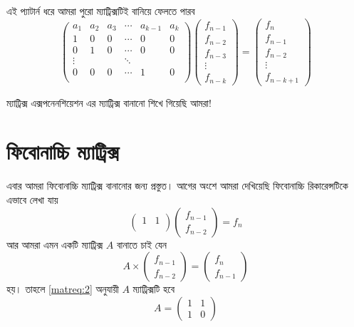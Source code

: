 \noindent এই প্যাটার্ন ধরে আমরা পুরো ম্যাট্রিক্সটিই বানিয়ে ফেলতে পারব
\begin{equation}
  \label{matreq:2}
  \begin{pmatrix}
  a_1 & a_2 & a_3 & \cdots & a_{k - 1} & a_k \\
  1 & 0 & 0 & \cdots & 0 & 0 \\
  0 & 1 & 0 & \cdots & 0 & 0 \\
  \vdots & & & \ddots \\
  0 & 0 & 0 & \cdots & 1 & 0 \\
  \end{pmatrix}
  \begin{pmatrix}
  f_{n - 1} \\
  f_{n - 2} \\
  f_{n - 3} \\
  \vdots \\
  f_{n - k}
  \end{pmatrix}
  =
  \begin{pmatrix}
  f_{n} \\
  f_{n - 1} \\
  f_{n - 2} \\
  \vdots \\
  f_{n - k + 1}
  \end{pmatrix}
\end{equation}

\noindent ম্যাট্রিক্স এক্সপনেনশিয়েশন এর ম্যাট্রিক্স বানানো শিখে গিয়েছি আমরা!

\section{ফিবোনাচ্চি ম্যাট্রিক্স}

\noindent এবার আমরা ফিবোনাচ্চি ম্যাট্রিক্স বানানোর জন্য প্রস্তুত। আগের অংশে আমরা দেখিয়েছি ফিবোনাচ্চি রিকারেন্সটিকে এভাবে লেখা যায়
$$
\begin{pmatrix}
1 & 1 \\
\end{pmatrix}
\begin{pmatrix}
f_{n - 1} \\
f_{n - 2}
\end{pmatrix}
=
f_n
$$
\noindent আর আমরা এমন একটি ম্যাট্রিক্স $A$ বানাতে চাই যেন
$$
A \times
\begin{pmatrix}
f_{n - 1} \\
f_{n - 2}
\end{pmatrix} =
\begin{pmatrix}
f_{n} \\
f_{n - 1}
\end{pmatrix}
$$
\noindent হয়। তাহলে \eqref{matreq:2} অনুযায়ী $A$ ম্যাট্রিক্সটি হবে
$$
A =
\begin{pmatrix}
1 & 1 \\
1 & 0
\end{pmatrix}
$$

